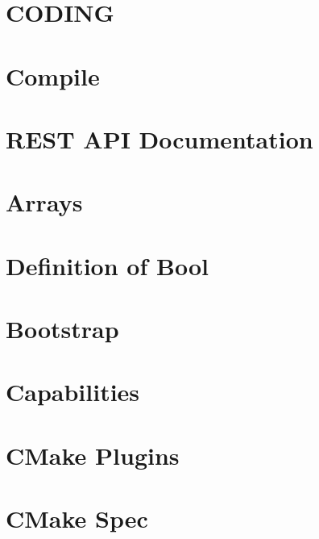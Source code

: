 \documentclass[twoside]{book}
\newcommand{\+}{\discretionary{\mbox{\scriptsize$\hookleftarrow$}}{}{}}
\begin{document}
\chapter{C\+O\+D\+I\+NG}
\label{doc_CODING_md}

\chapter{Compile}
\label{doc_COMPILE_md}

\chapter{R\+E\+ST A\+PI Documentation}
\label{doc_decisions_api_documentation_md}

\chapter{Arrays}
\label{doc_decisions_array_md}

\chapter{Definition of Bool}
\label{doc_decisions_bool_md}

\chapter{Bootstrap}
\label{doc_decisions_bootstrap_md}

\chapter{Capabilities}
\label{doc_decisions_capabilities_md}

\chapter{C\+Make Plugins}
\label{doc_decisions_cmake_plugins_md}

\chapter{C\+Make Spec}
\label{doc_decisions_cmake_spec_md}

\end{document}
